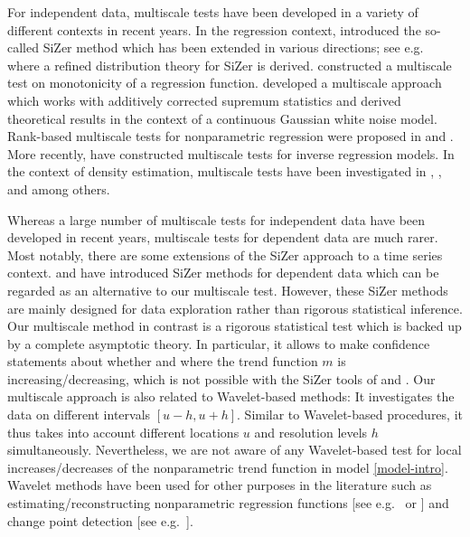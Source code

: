 For independent data, multiscale tests have been developed in a variety of different contexts in recent years. In the regression context, \cite{ChaudhuriMarron1999,ChaudhuriMarron2000} introduced the so-called SiZer method which has been extended in various directions; see e.g.\ \cite{HannigMarron2006} where a refined distribution theory for SiZer is derived. \cite{HallHeckman2000} constructed a multiscale test on monotonicity of a regression function. \cite{DuembgenSpokoiny2001} developed a multiscale approach which works with additively corrected supremum statistics and derived theoretical results in the context of a continuous Gaussian white noise model. Rank-based multiscale tests for nonparametric regression were proposed in \cite{Duembgen2002} and \cite{Rohde2008}. More recently, \cite{ProkschWernerMunk2018} have constructed multiscale tests for inverse regression models. In the context of density estimation, multiscale tests have been investigated in \cite{DuembgenWalther2008}, \cite{RufibachWalther2010}, \cite{SchmidtHieber2013} and \cite{EckleBissantzDette2017} among others. 


Whereas a large number of multiscale tests for independent data have been developed in recent years, multiscale tests for dependent data are much rarer. Most notably, there are some extensions of the SiZer approach to a time series context. \cite{Rondonotti2004} and \cite{Rondonotti2007} have introduced SiZer methods for dependent data which can be regarded as an alternative to our multiscale test. 
However, these SiZer methods are mainly designed for data exploration rather than rigorous statistical inference. Our multiscale method in contrast is a rigorous statistical test which is backed up by a complete asymptotic theory. In particular, it allows to make confidence statements about whether and where the trend function $m$ is increasing/decreasing, which is not possible with the SiZer tools of \cite{Rondonotti2004} and \cite{Rondonotti2007}. Our multiscale approach is also related to Wavelet-based methods: It investigates the data on different intervals $[u-h,u+h]$. Similar to Wavelet-based procedures, it thus takes into account different locations $u$ and resolution levels $h$ simultaneously. Nevertheless, we are not aware of any Wavelet-based test for local increases/decreases of the nonparametric trend function in model \eqref{model-intro}. Wavelet methods have been used for other purposes in the literature such as estimating/reconstructing nonparametric regression functions [see e.g.\ \cite{Donoho1995} or \cite{vonSachsMacGibbon2000}] and change point detection [see e.g.\ \citet{ChoFryzlewicz2012}]. 



